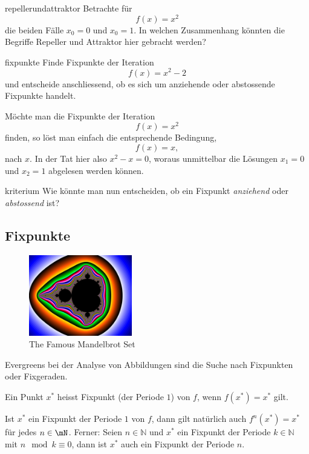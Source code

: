 \documentclass[%
<<<<<<< Updated upstream
11pt,%
twoside,%
titlepage,%
german,%
headsepline%
]{scrartcl}
\begin{document}
\begin{uebenv}{repellerundattraktor}
Betrachte für
$$f(x)=x^2$$
die beiden Fälle $x_0=0$ und $x_0=1$. In welchen Zusammenhang könnten die Begriffe Repeller und Attraktor hier gebracht werden?
\end{uebenv}



\begin{uebenv}{fixpunkte}
Finde Fixpunkte der Iteration
$$f(x)=x^2-2$$
und entscheide anschliessend, ob es sich um anziehende oder abstossende Fixpunkte handelt.
\end{uebenv}



\begin{bsp}
Möchte man die Fixpunkte der Iteration
$$f(x)=x^2$$
finden, so löst man einfach die entsprechende Bedingung,
$$f(x)=x,$$
nach $x$. In der Tat hier also $x^2-x=0$, woraus unmittelbar die Lösungen $x_1=0$ und $x_2=1$ abgelesen werden können.
\end{bsp}

\begin{uebenv}{kriterium}
Wie könnte man nun entscheiden, ob ein Fixpunkt \emph{anziehend} oder \emph{abstossend} ist?
\end{uebenv}




\subsection{Fixpunkte}
\begin{figure}
\centering
    \includegraphics[width=0.4\textwidth]{pictures/apfelmaennchen}
\caption{The Famous Mandelbrot Set}
\end{figure}

Evergreens bei der Analyse von Abbildungen sind die Suche nach Fixpunkten oder Fixgeraden.
\begin{cdef}[Fixpunkt]
Ein Punkt $x^*$ heisst Fixpunkt (der Periode $1$) von $f$, wenn $f(x^*)=x^*$ gilt.
\end{cdef}

\begin{bem}
Ist $x^*$ ein Fixpunkt der Periode $1$ von $f$, dann gilt natürlich auch $f^n(x^*)=x^*$ für jedes $n\in\mN$. Ferner: Seien $n\in\mathbb{N}$ und $x^*$ ein Fixpunkt der Periode $k\in\mathbb{N}$ mit $n\mod{k}\equiv0$, dann ist $x^*$ auch ein Fixpunkt der Periode $n$.
\end{bem}
\end{document}
